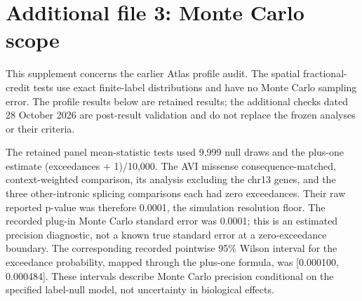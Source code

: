 \documentclass[
  11pt,
]{article}
\author{}
\date{}
\begin{document}
\section{Additional file 3: Monte Carlo
scope}\label{additional-file-3-monte-carlo-scope}

This supplement concerns the earlier Atlas profile audit. The spatial
fractional-credit tests use exact finite-label distributions and have no
Monte Carlo sampling error. The profile results below are retained
results; the additional checks dated 28 October 2026 are post-result
validation and do not replace the frozen analyses or their criteria.

The retained panel mean-statistic tests used 9,999 null draws and the
plus-one estimate (exceedances + 1)/10,000. The AVI missense
consequence-matched, context-weighted comparison, its analysis excluding
the chr13 genes, and the three other-intronic splicing comparisons each
had zero exceedances. Their raw reported p-value was therefore 0.0001,
the simulation resolution floor. The recorded plug-in Monte Carlo
standard error was 0.0001; this is an estimated precision diagnostic,
not a known true standard error at a zero-exceedance boundary. The
corresponding recorded pointwise 95\% Wilson interval for the exceedance
probability, mapped through the plus-one formula, was {[}0.000100,
0.000484{]}. These intervals describe Monte Carlo precision conditional
on the specified label-null model, not uncertainty in biological
effects.
\end{document}
